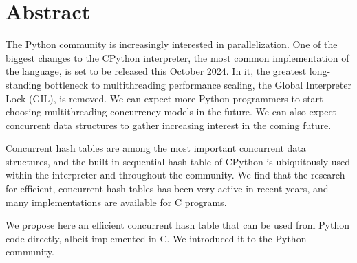 \chapter*{Abstract}
\label{ch:abstract}


The Python community is increasingly interested in parallelization.
One of the biggest changes to the CPython interpreter, the most common implementation of the language, is set to be released this October 2024.
In it, the greatest long-standing bottleneck to multithreading performance scaling, the Global Interpreter Lock (GIL), is removed.
We can expect more Python programmers to start choosing multithreading concurrency models in the future.
We can also expect concurrent data structures to gather increasing interest in the coming future.

Concurrent hash tables are among the most important concurrent data structures, and the built-in sequential hash table of CPython is ubiquitously used within the interpreter and throughout the community.
We find that the research for efficient, concurrent hash tables has been very active in recent years, and many implementations are available for C programs.

We propose here an efficient concurrent hash table that can be used from Python code directly, albeit implemented in C.
We introduced it to the Python community.
